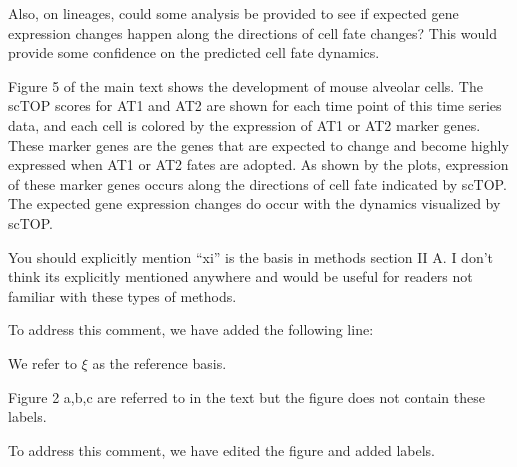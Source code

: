 \documentclass[12pt,american]{scrartcl}
\begin{document}
\begin{revcomment}
    Also, on lineages, could some analysis be provided to see if expected gene expression changes happen along the directions of cell fate changes? This would provide some confidence on the predicted cell fate 
dynamics.
\end{revcomment}
\begin{revresponse}
    Figure 5 of the main text shows the development of mouse alveolar cells. The scTOP scores for AT1 and AT2 are shown for each time point of this time series data, and each cell is colored by the expression of AT1 or AT2 marker genes. These marker genes are the genes that are expected to change and become highly expressed when AT1 or AT2 fates are adopted. As shown by the plots, expression of these marker genes occurs along the directions of cell fate indicated by scTOP. The expected gene expression changes do occur with the dynamics visualized by scTOP.
\end{revresponse}

\begin{revcomment}
    You should explicitly mention “xi” is the basis in methods 
section II A. I don’t think its explicitly mentioned anywhere and would 
be useful for readers not familiar with these types of methods.
\end{revcomment}
\begin{revresponse}
    To address this comment, we have added the following line:

    \begin{changes}
         We refer to $\xi$ as the reference basis.
    \end{changes}
\end{revresponse}

\begin{revcomment}
    Figure 2 a,b,c are referred to in the text but the figure does not contain these labels.
\end{revcomment}
\begin{revresponse}
    To address this comment, we have edited the figure and added labels.
\end{revresponse}
\end{document}
